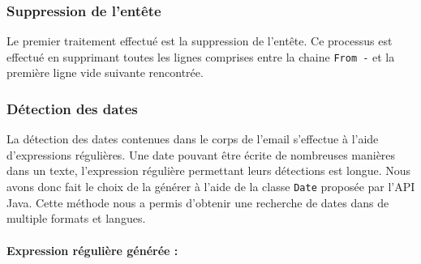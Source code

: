 \documentclass[a4paper,french,10pt]{article}
\begin{document}
\subsubsection{Suppression de l'entête}
Le premier traitement effectué est la suppression de l'entête. Ce processus est effectué en supprimant toutes les lignes comprises entre la chaine \og \texttt{From -} \fg{} et la première ligne vide suivante rencontrée.

\subsubsection{Détection des dates}
La détection des dates contenues dans le corps de l'email s'effectue à l'aide d'expressions régulières. Une date pouvant être écrite de nombreuses manières dans un texte, l'expression régulière permettant leurs détections est longue. Nous avons donc fait le choix de la générer à l'aide de la classe \texttt{Date} proposée par l'API Java. Cette méthode nous a permis d'obtenir une recherche de dates dans de multiple formats et langues.

\paragraph*{Expression régulière générée :}
\end{document}
